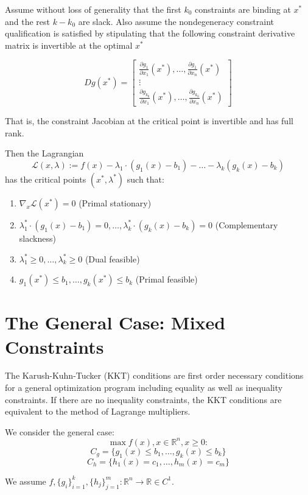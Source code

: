 \documentclass[11pt,]{article}
\providecommand{\tightlist}{%
  \setlength{\itemsep}{0pt}\setlength{\parskip}{0pt}}
\begin{document}
Assume without loss of generality that the first \(k_0\) constraints are
binding at \(x^*\) and the rest \(k-k_0\) are slack. Also assume the
nondegeneracy constraint qualification is satisfied by stipulating that
the following constraint derivative matrix is invertible at the optimal
\(x^*\)

\[
Dg(x^*) = \begin{bmatrix}
\frac{\partial g_1}{\partial x_1}(x^*), \hdots, \frac{\partial g_1}{\partial x_n}(x^*)\\
\vdots\\
\frac{\partial g_{k_0}}{\partial x_1}(x^*), \hdots, \frac{\partial g_{k_0}}{\partial x_n}(x^*)
\end{bmatrix}
\]

That is, the constraint Jacobian at the critical point is invertible and
has full rank.

Then the Lagrangian
\[\mathcal{L}(x,\lambda):=f(x)-\lambda_1\cdot(g_1(x)-b_1)-\hdots-\lambda_k(g_k(x)-b_k)\]
has the critical points \((x^*,\lambda^*)\) such that:

\begin{enumerate}
\def\labelenumi{\arabic{enumi}.}
\tightlist
\item
  \(\nabla_x\mathcal{L}(x^*)=0\) (Primal stationary)
\item
  \(\lambda_1^*\cdot(g_1(x)-b_1)=0,\hdots,\lambda_k^*\cdot(g_k(x)-b_k)=0\)
  (Complementary slackness)
\item
  \(\lambda_1^*\geq 0,\hdots, \lambda_k^*\geq 0\) (Dual feasible)
\item
  \(g_1(x^*)\leq b_1,\hdots,g_k(x^*)\leq b_k\) (Primal feasible)
\end{enumerate}

\section{The General Case: Mixed
Constraints}\label{the-general-case-mixed-constraints}

The Karush-Kuhn-Tucker (KKT) conditions are first order necessary
conditions for a general optimization program including equality as well
as inequality constraints. If there are no inequality constraints, the
KKT conditions are equivalent to the method of Lagrange multipliers.

We consider the general case: \[\max f(x), x\in \mathbb{R}^n, x\geq 0:\]
\[C_g=\{g_1(x)\leq b_1,\hdots,g_k(x)\leq b_k\}\]
\[C_h=\{h_1(x)=c_1,\hdots,h_m(x)=c_m\}\]

We assume
\(f,\{g_i\}_{i=1}^k,\{h_j\}_{j=1}^m:\mathbb{R}^n\to \mathbb{R}\in C^1\).
\end{document}
